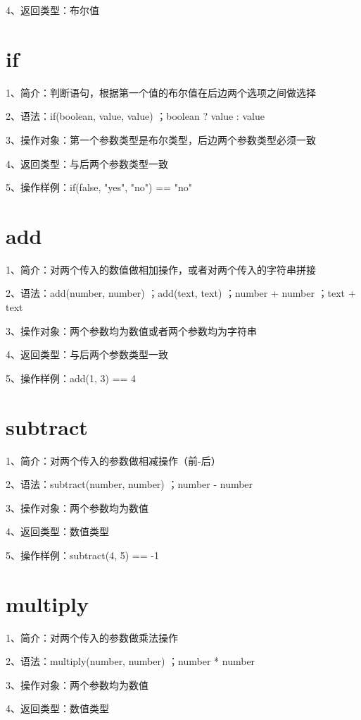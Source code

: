 4、返回类型：布尔值

\section{if}

1、简介：判断语句，根据第一个值的布尔值在后边两个选项之间做选择

2、语法：if(boolean, value, value) ；boolean ? value : value

3、操作对象：第一个参数类型是布尔类型，后边两个参数类型必须一致

4、返回类型：与后两个参数类型一致

5、操作样例：if(false, "yes", "no") == "no"

\section{add}

1、简介：对两个传入的数值做相加操作，或者对两个传入的字符串拼接

2、语法：add(number, number) ；add(text, text) ；number + number ；text + text

3、操作对象：两个参数均为数值或者两个参数均为字符串

4、返回类型：与后两个参数类型一致

5、操作样例：add(1, 3) == 4

\section{subtract}

1、简介：对两个传入的参数做相减操作（前-后）

2、语法：subtract(number, number) ；number - number

3、操作对象：两个参数均为数值

4、返回类型：数值类型

5、操作样例：subtract(4, 5) == -1

\section{multiply}

1、简介：对两个传入的参数做乘法操作

2、语法：multiply(number, number) ；number * number

3、操作对象：两个参数均为数值

4、返回类型：数值类型

